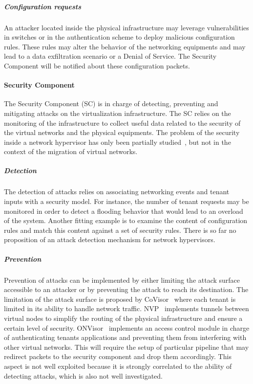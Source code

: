 \subparagraph{Configuration requests} An attacker located inside the physical infrastructure may leverage vulnerabilities in switches or in the authentication scheme to deploy malicious configuration rules. These rules may alter the behavior of the networking equipments and may lead to a data exfiltration scenario or a Denial of Service.
The Security Component will be notified about these configuration packets.

\paragraph{Security Component}
The Security Component (SC) is in charge of detecting, preventing and mitigating attacks on the virtualization infrastructure. The SC relies on the monitoring of the infrastructure to collect useful data related to the security of the virtual networks and the physical equipments.
The problem of the security inside a network hypervisor has only been partially studied~\cite{Costa2015}, but not in the context of the migration of virtual networks.

\subparagraph{Detection}
The detection of attacks relies on associating networking events and tenant inputs with a security model.
For instance, the number of tenant requests may be monitored in order to detect a flooding behavior that would lead to an overload of the system. Another fitting example is to examine the content of configuration rules and match this content against a set of security rules.
There is so far no proposition of an attack detection mechanism for network hypervisors.

\subparagraph{Prevention}
Prevention of attacks can be implemented by either limiting the attack surface accessible to an attacker or by preventing the attack to reach its destination. The limitation of the attack surface is proposed by CoVisor~\cite{CoVisor-Jin2015} where each tenant is limited in its ability to handle network traffic.
NVP~\cite{NVP-Koponen2014} implements tunnels between virtual nodes to simplify the routing of the physical infrastructure and ensure a certain level of security.
ONVisor~\cite{ONVisor-Han2018} implements an access control module in charge of authenticating tenants applications and preventing them from interfering with other virtual networks.
This will require the setup of particular pipeline that may redirect packets to the security component and drop them accordingly. This aspect is not well exploited because it is strongly correlated to the ability of detecting attacks, which is also not well investigated. 

